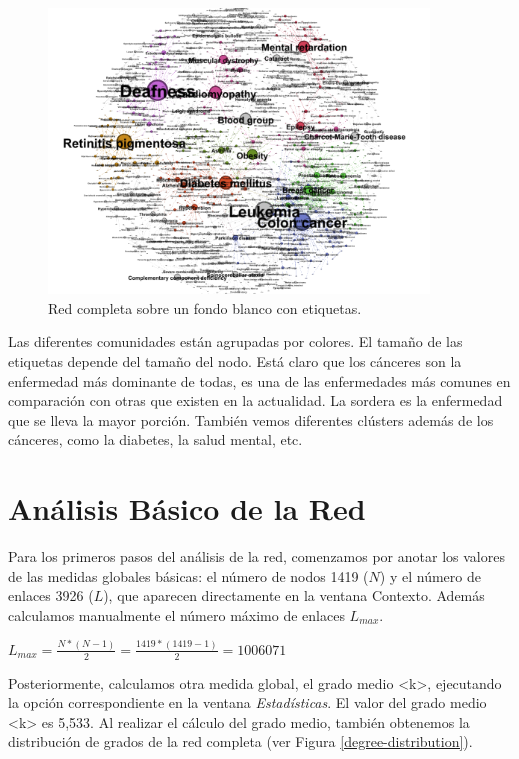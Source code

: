 \documentclass{uimppracticas}
\begin{document}
\begin{figure}[h]
	\centering
	\includegraphics[width=0.9\textwidth]{images/completa_FR_labels}
	\caption{Red completa sobre un fondo blanco con etiquetas.}
	\label{completa_FR_labels}
\end{figure}

Las diferentes comunidades están agrupadas por colores. El tamaño de las etiquetas depende del tamaño del nodo. Está claro que los cánceres son la enfermedad más dominante de todas, es una de las enfermedades más comunes en comparación con otras que existen en la actualidad. La sordera es la enfermedad que se lleva la mayor porción. También vemos diferentes clústers además de los cánceres, como la diabetes, la salud mental, etc. 

\section*{Análisis Básico de la Red}

Para los primeros pasos del análisis de la red, comenzamos por anotar los valores de las medidas globales básicas: el número de nodos 1419 ($N$) y el número de enlaces 3926 ($L$), que aparecen directamente en la ventana Contexto. Además calculamos manualmente el número máximo de enlaces $L_{max}$. 

\begin{center}
	$L_{max} = \frac{N * (N-1)}{2} = \frac{1419 * (1419-1)}{2} = 1006071$
\end{center}

Posteriormente, calculamos otra medida global, el grado medio <k>, ejecutando la opción correspondiente en la ventana \textit{Estadísticas}. El valor del grado medio <k> es 5,533. Al realizar el cálculo del grado medio, también obtenemos la distribución de grados de la red completa (ver Figura \ref{degree-distribution}).
\end{document}
